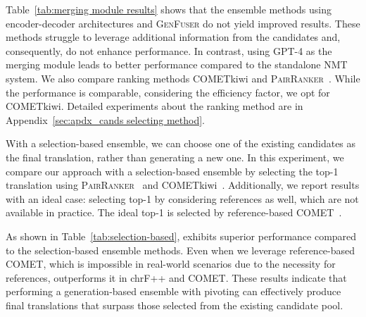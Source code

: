 Table~\ref{tab:merging module results} shows that the ensemble methods using encoder-decoder architectures and \textsc{GenFuser} do not yield improved results.
These methods struggle to leverage additional information from the candidates and, consequently, do not enhance performance. 
In contrast, using GPT-4 as the merging module leads to better performance compared to the standalone NMT system.
We also compare ranking methods COMETkiwi and \textsc{PairRanker}~\cite{llm-blender}.
While the performance is comparable, considering the efficiency factor, we opt for COMETkiwi.
Detailed experiments about the ranking method are in Appendix~\ref{sec:apdx_cands selecting method}.



With a selection-based ensemble, we can choose one of the existing candidates as the final translation, rather than generating a new one.
In this experiment, we compare our approach with a selection-based ensemble by selecting the top-1 translation using \textsc{PairRanker}~\cite{llm-blender} and COMETkiwi~\cite{rei2022cometkiwi}.
Additionally, we report results with an ideal case: selecting top-1 by considering references as well, which are not available in practice.
The ideal top-1 is selected by reference-based COMET~\cite{comet22}.


As shown in Table~\ref{tab:selection-based}, \ours exhibits superior performance compared to the selection-based ensemble methods.
Even when we leverage reference-based COMET, which is impossible in real-world scenarios due to the necessity for references, \ours outperforms it in chrF++ and COMET.
These results indicate that performing a generation-based ensemble with pivoting can effectively produce final translations that surpass those selected from the existing candidate pool.




